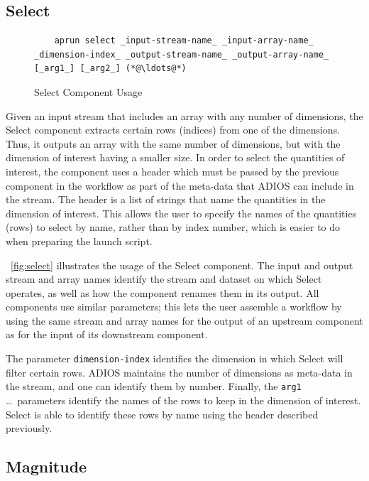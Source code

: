 \subsection{Select}

\begin{figure}
  \begin{lstlisting}
    aprun select _input-stream-name_ _input-array-name_ _dimension-index_ _output-stream-name_ _output-array-name_ [_arg1_] [_arg2_] (*@\ldots@*)
  \end{lstlisting}
  \vspace{-0.10in}
  \caption{Select Component Usage}
  \label{fig:select}
  \vspace{-0.10in}
\end{figure}

Given an input stream that includes an array with
any number of dimensions,
the Select component extracts certain rows (indices) from one of
the dimensions.
Thus, it outputs an array
with the same number of dimensions,
but with the dimension of interest having a
smaller size. In order to select the quantities of
interest, the component uses a header which
must be passed by the previous component in the
workflow as part of the meta-data that ADIOS
can include in the stream.
The header is a list of strings that
name the quantities in the
dimension of interest.
This allows the user to specify
the names of the quantities (rows)
to select by name, rather than by index number,
which is easier to do when preparing the launch script.

~\autoref{fig:select} illustrates the usage
of the Select component. 
The input and output stream and array names
identify the stream and dataset on
which Select operates, as well as how
the component renames them in its output.
All components use similar parameters; this lets
the user assemble a workflow by
using the same stream and array names
for the output of an upstream component
as for the input of its downstream component.

The parameter \texttt{dimension-index} identifies
the dimension in which Select will filter
certain rows. ADIOS maintains the number of dimensions
as meta-data in the stream, and one can identify them
by number. Finally, the \texttt{arg1} \ldots \ parameters 
identify the names of the rows to keep in the dimension
of interest. Select is able to identify these rows
by name using the header described previously.

\subsection{Magnitude}

